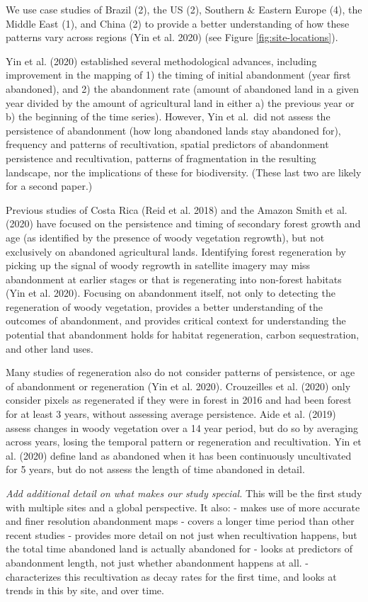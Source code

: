 \documentclass[
]{article}
\begin{document}
We use case studies of Brazil (2), the US (2), Southern \& Eastern Europe (4), the Middle East (1), and China (2) to provide a better understanding of how these patterns vary across regions (Yin et al. 2020) (see Figure \ref{fig:site-locations}).

Yin et al. (2020) established several methodological advances, including improvement in the mapping of 1) the timing of initial abandonment (year first abandoned), and 2) the abandonment rate (amount of abandoned land in a given year divided by the amount of agricultural land in either a) the previous year or b) the beginning of the time series). However, Yin et al.~did not assess the persistence of abandonment (how long abandoned lands stay abandoned for), frequency and patterns of recultivation, spatial predictors of abandonment persistence and recultivation, patterns of fragmentation in the resulting landscape, nor the implications of these for biodiversity. (These last two are likely for a second paper.)

Previous studies of Costa Rica (Reid et al. 2018) and the Amazon Smith et al. (2020) have focused on the persistence and timing of secondary forest growth and age (as identified by the presence of woody vegetation regrowth), but not exclusively on abandoned agricultural lands.
Identifying forest regeneration by picking up the signal of woody regrowth in satellite imagery may miss abandonment at earlier stages or that is regenerating into non-forest habitats (Yin et al. 2020).
Focusing on abandonment itself, not only to detecting the regeneration of woody vegetation, provides a better understanding of the outcomes of abandonment, and provides critical context for understanding the potential that abandonment holds for habitat regeneration, carbon sequestration, and other land uses.

Many studies of regeneration also do not consider patterns of persistence, or age of abandonment or regeneration (Yin et al. 2020).
Crouzeilles et al. (2020) only consider pixels as regenerated if they were in forest in 2016 and had been forest for at least 3 years, without assessing average persistence.
Aide et al. (2019) assess changes in woody vegetation over a 14 year period, but do so by averaging across years, losing the temporal pattern or regeneration and recultivation.
Yin et al. (2020) define land as abandoned when it has been continuously uncultivated for 5 years, but do not assess the length of time abandoned in detail.

\emph{Add additional detail on what makes our study special.}
This will be the first study with multiple sites and a global perspective. It also:
- makes use of more accurate and finer resolution abandonment maps
- covers a longer time period than other recent studies
- provides more detail on not just when recultivation happens, but the total time abandoned land is actually abandoned for
- looks at predictors of abandonment length, not just whether abandonment happens at all.
- characterizes this recultivation as decay rates for the first time, and looks at trends in this by site, and over time.
\end{document}

